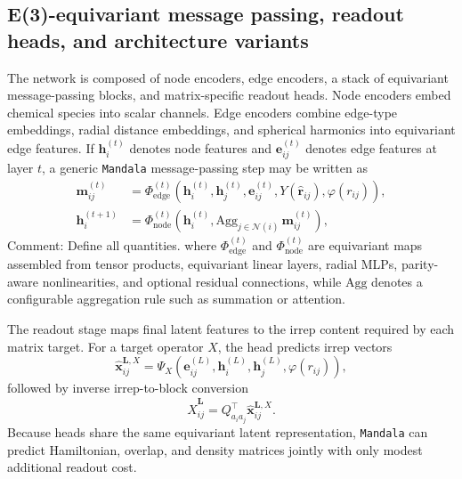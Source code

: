 \subsection{E(3)-equivariant message passing, readout heads, and architecture variants}
\label{subsec:architecture}

The network is composed of node encoders, edge encoders, a stack of equivariant
message-passing blocks, and matrix-specific readout heads. Node encoders embed
chemical species into scalar channels. Edge encoders combine edge-type
embeddings, radial distance embeddings, and spherical harmonics into equivariant
edge features. If $\bm{h}_i^{(t)}$ denotes node features and
$\bm{e}_{ij}^{(t)}$ denotes edge features at layer $t$, a generic \texttt{Mandala}
message-passing step may be written as
\begin{align}
\bm{m}_{ij}^{(t)} &=
\Phi_{\mathrm{edge}}^{(t)}
\left(
\bm{h}_i^{(t)}, \bm{h}_j^{(t)}, \bm{e}_{ij}^{(t)},
Y(\hat{\bm{r}}_{ij}), \varphi(r_{ij})
\right), \\
\bm{h}_i^{(t+1)} &=
\Phi_{\mathrm{node}}^{(t)}
\left(
\bm{h}_i^{(t)},
\mathrm{Agg}_{j \in \mathcal{N}(i)} \, \bm{m}_{ij}^{(t)}
\right),
\end{align}
Comment: Define all quantities.
where $\Phi_{\mathrm{edge}}^{(t)}$ and $\Phi_{\mathrm{node}}^{(t)}$ are
equivariant maps assembled from tensor products, equivariant linear layers,
radial MLPs, parity-aware nonlinearities, and optional residual connections,
while $\mathrm{Agg}$ denotes a configurable aggregation rule such as summation
or attention.

The readout stage maps final latent features to the irrep content required by
each matrix target. For a target operator $X$, the head predicts irrep vectors
\begin{equation}
\widehat{\bm{x}}_{ij}^{\bm{L},X}
=
\Psi_X\!\left(
\bm{e}_{ij}^{(L)},
\bm{h}_i^{(L)},
\bm{h}_j^{(L)},
\varphi(r_{ij})
\right),
\end{equation}
followed by inverse irrep-to-block conversion
\begin{equation}
\widehat{X}_{ij}^{\bm{L}}
=
Q_{a_i a_j}^{\top}\widehat{\bm{x}}_{ij}^{\bm{L},X}.
\end{equation}
Because heads share the same equivariant latent representation, \texttt{Mandala} can
predict Hamiltonian, overlap, and density matrices jointly with only modest
additional readout cost.

